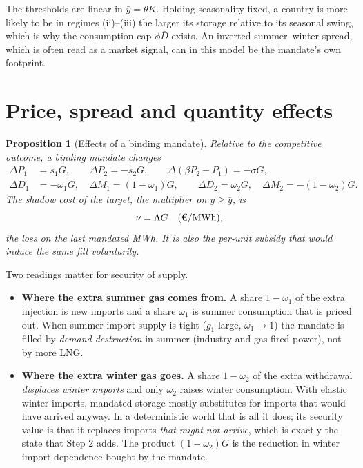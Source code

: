 \documentclass[11pt]{article}
\providecommand{\euro}{\texteuro}
\newtheorem{proposition}{Proposition}
\theoremstyle{definition}
\newcommand{\ybar}{\bar y}
\begin{document}
The thresholds are linear in $\ybar=\theta K$. Holding seasonality fixed, a country is more likely to
be in regimes (ii)--(iii) the larger its storage relative to its seasonal swing, which is why the
consumption cap $\phi\bar D$ exists. An inverted summer--winter spread, which is often read as a
market signal, can in this model be the mandate's own footprint.

\section{Price, spread and quantity effects}

\begin{proposition}[Effects of a binding mandate]\label{prop:effects}
Relative to the competitive outcome, a binding mandate changes
\begin{align}
\Delta P_1 &= s_1 G, \qquad \Delta P_2 = -s_2G, \qquad
\Delta(\beta P_2-P_1) = -\sigma G,\\
\Delta D_1 &= -\omega_1 G, \quad \Delta M_1 = (1-\omega_1)G, \qquad
\Delta D_2 = \omega_2 G, \quad \Delta M_2 = -(1-\omega_2)G .
\end{align}
The shadow cost of the target, the multiplier on $y\ge\ybar$, is
\begin{equation}
\nu = \Lambda G \quad(\text{\euro/MWh}),
\end{equation}
the loss on the last mandated MWh. It is also the per-unit subsidy that would induce the same fill
voluntarily.
\end{proposition}

Two readings matter for security of supply.
\begin{itemize}
\item \textbf{Where the extra summer gas comes from.} A share $1-\omega_1$ of the extra injection is new
imports and a share $\omega_1$ is summer consumption that is priced out. When summer import supply is tight
($g_1$ large, $\omega_1\to 1$) the mandate is filled by \emph{demand destruction} in summer (industry and
gas-fired power), not by more LNG.
\item \textbf{Where the extra winter gas goes.} A share $1-\omega_2$ of the extra withdrawal \emph{displaces
winter imports} and only $\omega_2$ raises winter consumption. With elastic winter imports, mandated
storage mostly substitutes for imports that would have arrived anyway. In a deterministic world that is
all it does; its security value is that it replaces imports \emph{that might not arrive}, which is exactly
the state that Step 2 adds. The product $(1-\omega_2)G$ is the reduction in winter import dependence
bought by the mandate.
\end{itemize}
\end{document}
